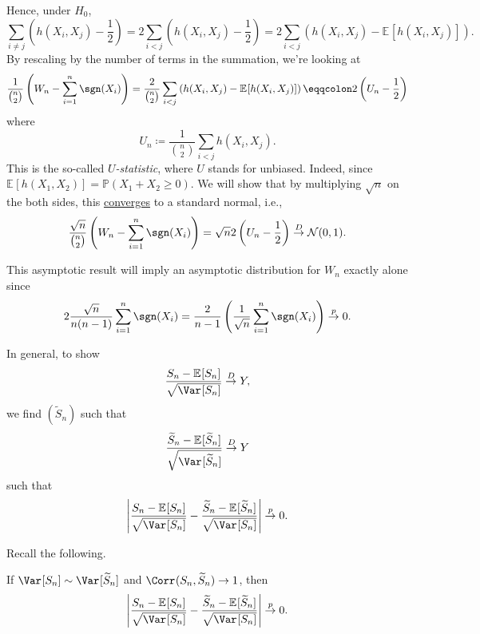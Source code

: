 Hence, under \(H_0\),
\[
	\sum_{i \neq j} \left( h(X_i, X_j) - \frac{1}{2} \right)
	= 2 \sum_{i < j} \left( h(X_i, X_j) - \frac{1}{2} \right)
	= 2 \sum_{i < j} \left( h(X_i, X_j) - \mathbb{E}_{}[h(X_i, X_j)] \right).
\]
By rescaling by the number of terms in the summation, we're looking at
\[
	\frac{1}{\binom{n}{2}} \left( W_n - \sum_{i=1}^{n} \sgn (X_i) \right)
	= \frac{2}{\binom{n}{2}} \sum_{i < j} \left( h(X_i, X_j) - \mathbb{E}_{}[h(X_i, X_j)] \right)
	\eqqcolon 2 \left( U_n - \frac{1}{2} \right)
\]
where
\[
	U_n \coloneqq \frac{1}{\binom{n}{2}} \sum_{i < j} h(X_i, X_j).
\]
This is the so-called \emph{\(U\)-statistic}, where \(U\) stands for unbiased. Indeed, since \(\mathbb{E}_{}[h(X_1, X_2)] = \mathbb{P} (X_1 + X_2 \geq 0)\). We will show that by multiplying \(\sqrt{n} \) on the both sides, this \hyperref[def:converge-in-distribution]{converges} to a standard normal, i.e.,
\[
	\frac{\sqrt{n}}{\binom{n}{2}}  \left( W_n - \sum_{i=1}^{n} \sgn (X_i) \right)
	= \sqrt{n} 2 \left( U_n - \frac{1}{2} \right)
	\overset{D}{\to} \mathcal{N} (0, 1).
\]

\begin{note}
	This asymptotic result will imply an asymptotic distribution for \(W_n\) exactly alone since
	\[
		2 \frac{\sqrt{n} }{n(n-1)} \sum_{i=1}^{n} \sgn (X_i)
		= \frac{2}{n-1} \left( \frac{1}{\sqrt{n} } \sum_{i=1}^{n} \sgn (X_i) \right)
		\overset{p}{\to} 0.
	\]
\end{note}

In general, to show
\[
	\frac{S_n - \mathbb{E}_{}[S_n] }{\sqrt{\Var_{}[S_n] } }
	\overset{D}{\to} Y,
\]
we find \((\widetilde{S} _n)\) such that
\[
	\frac{\widetilde{S} _n - \mathbb{E}_{}[\widetilde{S} _n] }{\sqrt{\Var_{}[\widetilde{S} _n] } }
	\overset{D}{\to} Y
\]
such that
\[
	\left\vert \frac{S_n - \mathbb{E}_{}[S_n] }{\sqrt{\Var_{}[S_n] } } - \frac{\widetilde{S} _n - \mathbb{E}_{}[\widetilde{S} _n] }{\sqrt{\Var_{}[S_n] } }\right\vert
	\overset{p}{\to} 0.
\]

Recall the following.

\begin{proposition}
	If \(\Var_{}[S_n]\sim \Var_{}[\widetilde{S} _n] \) and \(\Corr_{}(S_n, \widetilde{S} _n) \to 1\), then
	\[
		\left\vert \frac{S_n - \mathbb{E}_{}[S_n] }{\sqrt{\Var_{}[S_n] } } - \frac{\widetilde{S} _n - \mathbb{E}_{}[\widetilde{S} _n] }{\sqrt{\Var_{}[S_n] } } \right\vert
		\overset{p}{\to} 0.
	\]
\end{proposition}